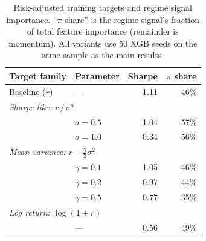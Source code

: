 \begin{table}[H]
\centering
\begin{tabular}{l l r r}
\toprule
Target family & Parameter & Sharpe & $\pi$ share \\
\midrule
Baseline ($r$) & --- & 1.11 & 46\% \\
\midrule
\multicolumn{4}{l}{\textit{Sharpe-like: $r\,/\,\sigma^a$}} \\[2pt]
 & $a = 0.5$ & 1.04 & 57\% \\
 & $a = 1.0$ & 0.34 & 56\% \\
\midrule
\multicolumn{4}{l}{\textit{Mean-variance: $r - \frac{\gamma}{2}\sigma^2$}} \\[2pt]
 & $\gamma = 0.1$ & 1.05 & 46\% \\
 & $\gamma = 0.2$ & 0.97 & 44\% \\
 & $\gamma = 0.5$ & 0.77 & 35\% \\
\midrule
\multicolumn{4}{l}{\textit{Log return: $\log(1+r)$}} \\[2pt]
 & --- & 0.56 & 49\% \\
\bottomrule
\end{tabular}
\caption{Risk-adjusted training targets and regime signal importance. ``$\pi$ share'' is the regime signal's fraction of total feature importance (remainder is momentum). All variants use 50 XGB seeds on the same sample as the main results.}
\label{tab:risk_aversion}
\end{table}
